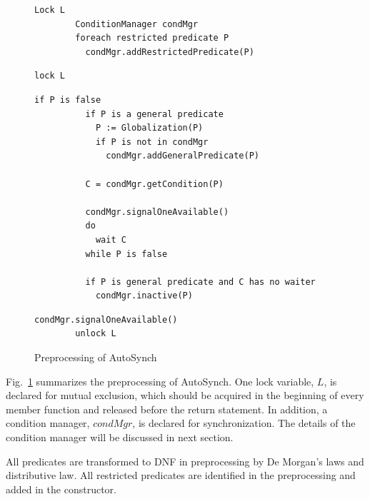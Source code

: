 \documentclass[preprint]{sigplanconf}
\begin{document}
\begin{figure}[ht!]
    \begin{Verbatim}[fontsize=\footnotesize,gobble=8,frame=topline,
            framesep=3mm,label=\fbox{\small\emph{Constructor}}]
        Lock L
        ConditionManager condMgr 
        foreach restricted predicate P
          condMgr.addRestrictedPredicate(P)
    \end{Verbatim}
    \begin{Verbatim}[fontsize=\footnotesize,gobble=8,frame=topline,
            framesep=3mm,label=\fbox{\small\emph{Entry}}]
        lock L
    \end{Verbatim}
    \begin{Verbatim}[fontsize=\footnotesize,gobble=8,frame=topline,
            framesep=3mm,label=\fbox{\small\emph{Waituntil(P)}}]
        if P is false 
          if P is a general predicate 
            P := Globalization(P)
            if P is not in condMgr
              condMgr.addGeneralPredicate(P)
              
          C = condMgr.getCondition(P)
        
          condMgr.signalOneAvailable()
          do 
            wait C
          while P is false
       
          if P is general predicate and C has no waiter
            condMgr.inactive(P) 
    \end{Verbatim}
    \begin{Verbatim}[fontsize=\footnotesize,gobble=8,frame=lines,
            framesep=3mm,label=\fbox{\small\emph{Exit}}]
        condMgr.signalOneAvailable() 
        unlock L
    \end{Verbatim}
  \caption{Preprocessing of AutoSynch}
  \label{fig:prep}
\end{figure}  

Fig.~\ref{fig:prep} summarizes the preprocessing of AutoSynch. One lock variable,
$L$, is declared for mutual exclusion, which should be acquired in the 
beginning of every member function and released before the return statement.
In addition, a condition manager, $condMgr$, is declared for 
synchronization. The details of the condition manager will be discussed in next
section.  

All predicates are transformed to DNF in
preprocessing by De Morgan's laws and distributive law. All restricted
predicates are identified in the preprocessing and added in the constructor. 
\end{document}
